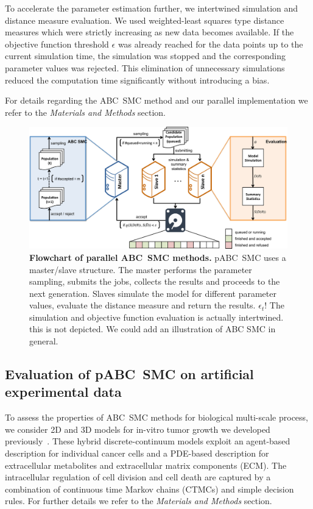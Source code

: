 \documentclass[10pt,letterpaper]{article}
\newcommand{\jh}[1]{{\color{red}#1}}
\begin{document}
To accelerate the parameter estimation further, we intertwined simulation and distance measure evaluation. We used weighted-least squares type distance measures which were strictly increasing as new data becomes available. If the objective function threshold $\epsilon$ was already reached for the data points up to the current simulation time, the simulation was stopped and the corresponding parameter values was rejected. This elimination of unnecessary simulations reduced the computation time significantly without introducing a bias.

For details regarding the ABC~SMC method and our parallel implementation we refer to the \textit{Materials and Methods} section.

\begin{figure}[t]
\includegraphics[width=\textwidth]{Figures/Pipeline.pdf}
\caption{{\bf Flowchart of parallel ABC~SMC methods.}
pABC~SMC uses a master/slave structure. The master performs the parameter sampling, submits the jobs, collects the results and proceeds to the next generation. Slaves simulate the model for different parameter values, evaluate the distance measure and return the results.
\jh{$\epsilon_t$!}
\jh{The simulation and objective function evaluation is actually intertwined. this is not depicted.}
\jh{We could add an illustration of ABC SMC in general.}
}
\label{fig:Pipeline}
\end{figure}

\subsection*{Evaluation of pABC~SMC on artificial experimental data}

To assess the properties of ABC~SMC methods for biological multi-scale process, we consider 2D and 3D models for in-vitro tumor growth we developed previously~\cite{JagiellaMul2015}. These hybrid discrete-continuum models exploit an agent-based description for individual cancer cells and a PDE-based description for extracellular metabolites and extracellular matrix components (ECM). The intracellular regulation of cell division and cell death are captured by a combination of continuous time Markov chains (CTMCs) and simple decision rules. For further details we refer to the \textit{Materials and Methods} section.
\end{document}
